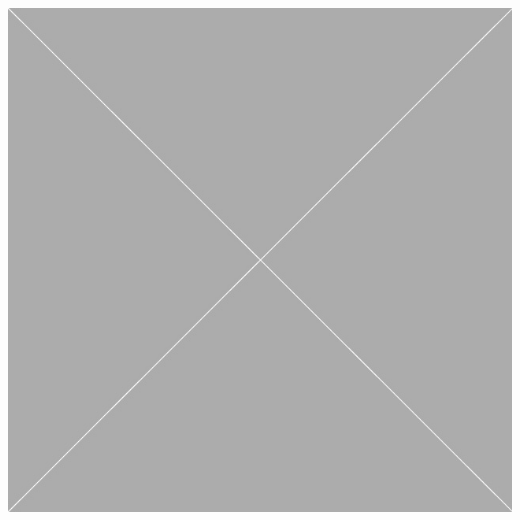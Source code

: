 \documentclass[10pt,oneside]{book}
\begin{document}
\begin{widefigure}
  \begin{minipage}[t]{0.25\linewidth}
    \mbox{}\\
    \label{fig:blah}
  \end{minipage}
  \hfill
  \begin{minipage}[t]{0.715\linewidth}
    \mbox{}\\
    \includegraphics[width=\linewidth]{Pictures/placeholder.jpg}
  \end{minipage}
\end{widefigure}
\end{document}
